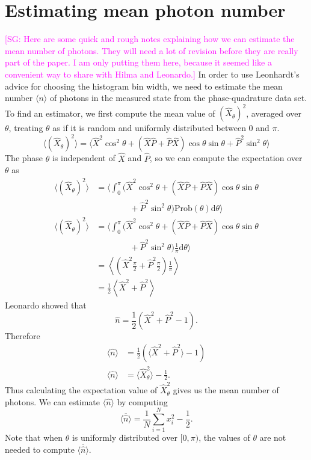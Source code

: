 \documentclass[
reprint,
superscriptaddress,
showpacs,
amsmath,
amssymb,
aps,
pra,
longbibliography
]{revtex4-1}
\providecommand{\aucmnt}[1]{#1}
\providecommand{\editcolor}[2]{\textcolor{#1}{#2}}
\providecommand{\aucmnt}[1]{}
\providecommand{\editcolor}[2]{#2}
\newcommand{\SGc}[1]{\aucmnt{\editcolor{magenta}{[SG: #1]}}}
\begin{document}
\section{Estimating mean photon number}
\label{sec-photon-estimation}
\SGc{Here are some quick and rough notes explaining how we can
  estimate the mean number of photons.  They will need a lot of
  revision before they are really part of the paper.  I am only
  putting them here, because it seemed like a convenient way to share
  with Hilma and Leonardo.}  In order to use Leonhardt's advice for
choosing the histogram bin width, we need to estimate the mean number
$\langle n \rangle$ of photons in the measured state from the
phase-quadrature data set.  To find an estimator, we first compute the
mean value of $(\hat{X}_{\theta})^{2}$, averaged over $\theta$, treating
$\theta$ as if it is random and uniformly distributed between $0$ and
$\pi$.
\begin{equation}
\langle (\hat{X}_{\theta})^{2} \rangle = \langle \hat{X}^{2}\cos^{2}\theta + (\hat{X}\hat{P}+\hat{P}\hat{X})\cos\theta\sin\theta + \hat{P}^{2}\sin^{2}\theta \rangle
\end{equation}
The phase $\theta$ is independent of $\hat{X}$ and $\hat{P}$, so we can compute the expectation over $\theta$ as
\begin{align}
\langle (\hat{X}_{\theta})^{2} \rangle &= \Big\langle \int_{0}^{\pi} (\hat{X}^{2}\cos^{2}\theta + (\hat{X}\hat{P}+\hat{P}\hat{X})\cos\theta\sin\theta \nonumber \\
 & \qquad \qquad + \hat{P}^{2}\sin^{2}\theta) \mathrm{Prob}(\theta) \mathrm{d}\theta \Big\rangle \\
\langle (\hat{X}_{\theta})^{2} \rangle &= \Big\langle \int_{0}^{\pi} (\hat{X}^{2}\cos^{2}\theta + (\hat{X}\hat{P}+\hat{P}\hat{X})\cos\theta\sin\theta \nonumber \\
 & \qquad \qquad + \hat{P}^{2}\sin^{2}\theta) \frac{1}{\pi} \mathrm{d}\theta \Big\rangle \\
 &= \left\langle (\hat{X}^{2}\frac{\pi}{2} + \hat{P}^{2}\frac{\pi}{2})\frac{1}{\pi} \right\rangle \\
 &= \frac{1}{2}\left\langle \hat{X}^{2} + \hat{P}^{2} \right\rangle
\end{align}
Leonardo showed that
\begin{equation}
\hat{n} = \frac{1}{2}\left(\hat{X}^{2}+\hat{P}^{2}-1\right).
\end{equation}
Therefore
\begin{align}
\langle\hat{n}\rangle &= \frac{1}{2}\left(\langle\hat{X}^{2}+\hat{P}^{2}\rangle-1\right) \\
\langle\hat{n}\rangle &= \langle \hat{X}_{\theta}^{2}\rangle-\frac{1}{2}. 
\end{align}
Thus calculating the expectation value of $\hat{X}_{\theta}^{2}$ gives us the mean number of photons.  We can estimate $\langle \hat{n} \rangle$ by computing
\begin{equation}
\overline{\langle \hat{n} \rangle} = \frac{1}{N} \sum_{i=1}^{N}x_{i}^{2} - \frac{1}{2}.
\label{eq-photon-estimation}
\end{equation}
Note that when $\theta$ is uniformly distributed over $[0,\pi)$, the values of $\theta$ are not needed to compute $\overline{\langle \hat{n} \rangle}$.
\end{document}
